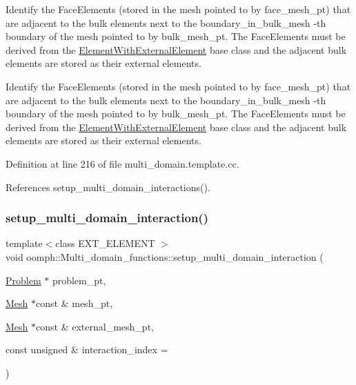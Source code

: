 Identify the {\ttfamily Face\+Elements} (stored in the mesh pointed to by {\ttfamily face\+\_\+mesh\+\_\+pt}) that are adjacent to the bulk elements next to the {\ttfamily boundary\+\_\+in\+\_\+bulk\+\_\+mesh} -\/th boundary of the mesh pointed to by {\ttfamily bulk\+\_\+mesh\+\_\+pt}. The {\ttfamily Face\+Elements} must be derived from the {\ttfamily \hyperlink{classoomph_1_1ElementWithExternalElement}{Element\+With\+External\+Element}} base class and the adjacent bulk elements are stored as their external elements. 

Identify the {\ttfamily Face\+Elements} (stored in the mesh pointed to by {\ttfamily face\+\_\+mesh\+\_\+pt}) that are adjacent to the bulk elements next to the {\ttfamily boundary\+\_\+in\+\_\+bulk\+\_\+mesh} -\/th boundary of the mesh pointed to by {\ttfamily bulk\+\_\+mesh\+\_\+pt}. The {\ttfamily Face\+Elements} must be derived from the {\ttfamily \hyperlink{classoomph_1_1ElementWithExternalElement}{Element\+With\+External\+Element}} base class and the adjacent bulk elements are stored as their external elements. 

Definition at line 216 of file multi\+\_\+domain.\+template.\+cc.



References setup\+\_\+multi\+\_\+domain\+\_\+interactions().

\mbox{\label{namespaceoomph_1_1Multi__domain__functions_ac64183e03f173c69ed6ed6f493a1a67e}} 
\subsubsection{\texorpdfstring{setup\+\_\+multi\+\_\+domain\+\_\+interaction()}{setup\_multi\_domain\_interaction()}\hspace{0.1cm}{\footnotesize\ttfamily [1/3]}}
{\footnotesize\ttfamily template$<$class E\+X\+T\+\_\+\+E\+L\+E\+M\+E\+NT $>$ \\
void oomph\+::\+Multi\+\_\+domain\+\_\+functions\+::setup\+\_\+multi\+\_\+domain\+\_\+interaction (\begin{DoxyParamCaption}\item[{\hyperlink{classoomph_1_1Problem}{Problem} $\ast$}]{problem\+\_\+pt,  }\item[{\hyperlink{classoomph_1_1Mesh}{Mesh} $\ast$const \&}]{mesh\+\_\+pt,  }\item[{\hyperlink{classoomph_1_1Mesh}{Mesh} $\ast$const \&}]{external\+\_\+mesh\+\_\+pt,  }\item[{const unsigned \&}]{interaction\+\_\+index = {} }\end{DoxyParamCaption})}



